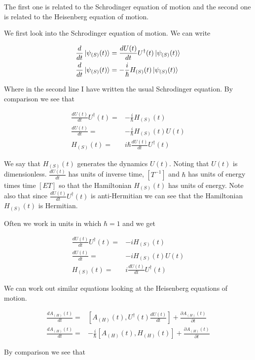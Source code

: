 \documentclass[12pt]{article}
\begin{document}
The first one is related to the Schrodinger equation of motion and the second one is related to the Heisenberg equation of motion.

We first look into the Schrodinger equation of motion.
We can write

\begin{align}
\frac{d}{dt}\ket{\psi_{(S)}(t)} &= \frac{dU(t)}{dt}U^{\dag}(t)\ket{\psi_{(S)}(t)}\\
\frac{d}{dt}\ket{\psi_{(S)}(t)} &= -\frac{i}{\hbar}H_{(S)}(t) \ket{\psi_{(S)}(t)}
\end{align}

Where in the second line I have written the usual Schrodinger equation.
By comparison we see that

\begin{align}
\frac{dU(t)}{dt}U^{\dag}(t) =& -\frac{i}{\hbar}H_{(S)}(t)\\
\frac{dU(t)}{dt} =& -\frac{i}{\hbar}H_{(S)}(t)U(t)\\
H_{(S)}(t) =& i\hbar \frac{dU(t)}{dt}U^{\dag}(t)
\end{align}

We say that $H_{(S)}(t)$ generates the dynamics $U(t)$.
Noting that $U(t)$ is dimensionless. $\frac{dU(t)}{dt}$ has units of inverse time, $[T^{-1}]$ and $\hbar$ has units of energy times time $[ET]$ so that the Hamiltonian $H_{(S)}(t)$ has units of energy.
Note also that since $\frac{dU(t)}{dt}U^{\dag}(t)$ is anti-Hermitian we can see that the Hamiltonian $H_{(S)}(t)$ is Hermitian.


Often we work in units in which $\hbar=1$ and we get

\begin{align}
\frac{dU(t)}{dt}U^{\dag}(t) =& -i H_{(S)}(t)\\
\frac{dU(t)}{dt} =& -i H_{(S)}(t)U(t)\\
H_{(S)}(t) =& i \frac{dU(t)}{dt}U^{\dag}(t)
\end{align}

We can work out similar equations looking at the Heisenberg equations of motion.

\begin{align}
\frac{dA_{(H)}(t)}{dt} =& \left[A_{(H)}(t), U^{\dag}(t)\frac{dU(t)}{dt}\right] + \frac{\partial A_{(H)}(t)}{\partial t}\\
\frac{dA_{(H)}(t)}{dt} =& -\frac{i}{\hbar}\left[A_{(H)}(t), H_{(H)}(t)\right] + \frac{\partial A_{(H)}(t)}{\partial t}
\end{align}

By comparison we see that
\end{document}
